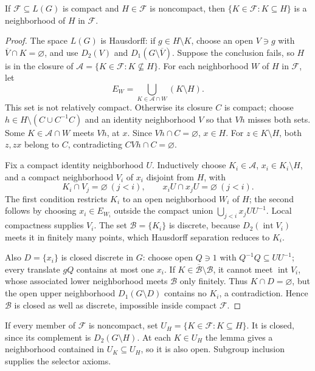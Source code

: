 \begin{lemma}
If \(\mathcal F\subseteq L(G)\) is compact and \(H\in\mathcal F\)
is noncompact, then \(\{K\in\mathcal F:K\subseteq H\}\) is a
neighborhood of \(H\) in \(\mathcal F\).
\end{lemma}
\begin{proof}
The space \(L(G)\) is Hausdorff: if \(g\in H\setminus K\), choose an
open \(V\ni g\) with \(\overline V\cap K=\varnothing\), and use
\(D_2(V)\) and \(D_1(G\setminus\overline V)\).
Suppose the conclusion fails, so \(H\) is in the closure of
\(\mathcal A=\{K\in\mathcal F:K\nsubseteq H\}\).
For each neighborhood \(W\) of \(H\) in \(\mathcal F\), let
\[
 E_W=\bigcup_{K\in\mathcal A\cap W}(K\setminus H).
\]
This set is not relatively compact. Otherwise its closure \(C\)
is compact; choose \(h\in H\setminus(C\cup C^{-1}C)\) and an identity
neighborhood \(V\) so that \(Vh\) misses both sets.
Some \(K\in\mathcal A\cap W\) meets \(Vh\), at \(x\).
Since \(Vh\cap C=\varnothing\), \(x\in H\).
For \(z\in K\setminus H\), both \(z,zx\) belong to \(C\), contradicting
\(CVh\cap C=\varnothing\).

Fix a compact identity neighborhood \(U\). Inductively choose
\(K_i\in\mathcal A\), \(x_i\in K_i\setminus H\), and a compact
neighborhood \(V_i\) of \(x_i\) disjoint from \(H\), with
\[
 K_i\cap V_j=\varnothing\ (j<i),\qquad
 x_iU\cap x_jU=\varnothing\ (j<i).
\]
The first condition restricts \(K_i\) to an open neighborhood \(W_i\)
of \(H\); the second follows by choosing \(x_i\in E_{W_i}\)
outside the compact union \(\bigcup_{j<i}x_jUU^{-1}\).
Local compactness supplies \(V_i\).
The set \(\mathcal B=\{K_i\}\) is discrete, because
\(D_2(\operatorname{int}V_i)\) meets it in finitely many points,
which Hausdorff separation reduces to \(K_i\).

Also \(D=\{x_i\}\) is closed discrete in \(G\): choose open \(Q\ni1\)
with \(Q^{-1}Q\subseteq UU^{-1}\); every translate \(gQ\) contains
at most one \(x_i\). If \(K\in\overline{\mathcal B}\setminus\mathcal B\),
it cannot meet \(\operatorname{int}V_i\), whose associated lower
neighborhood meets \(\mathcal B\) only finitely.
Thus \(K\cap D=\varnothing\), but the open upper neighborhood
\(D_1(G\setminus D)\) contains no \(K_i\), a contradiction.
Hence \(\mathcal B\) is closed as well as discrete, impossible
inside compact \(\mathcal F\).
\end{proof}

If every member of \(\mathcal F\) is noncompact, set
\(U_H=\{K\in\mathcal F:K\subseteq H\}\).
It is closed, since its complement is \(D_2(G\setminus H)\).
At each \(K\in U_H\) the lemma gives a neighborhood contained in
\(U_K\subseteq U_H\), so it is also open. Subgroup inclusion supplies
the selector axioms.

